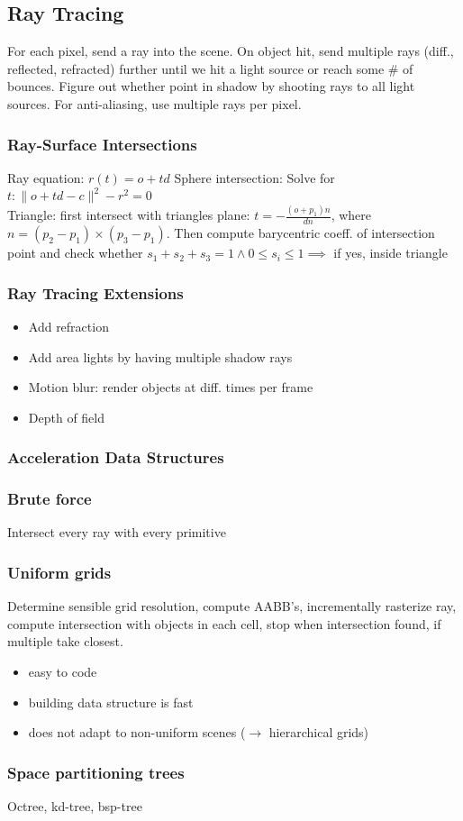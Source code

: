\documentclass[a4paper,10pt]{article}
\newcommand*\good{\item[\textcolor{goodgreen}{\(\bm{+}\)}]}
\newcommand*\bad{\item[\textcolor{badred}{\(\bm{-}\)}]}
\begin{document}
\subsection{Ray Tracing}
For each pixel, send a ray into the scene. On object hit, send multiple rays (diff., reflected, refracted) further until we hit a light source or reach some \# of bounces. Figure out whether point in shadow by shooting rays to all light sources. For anti-aliasing, use multiple rays per pixel.

\subsubsection{Ray-Surface Intersections} Ray equation: \( r(t) = o + td \)
Sphere intersection: Solve for \( t: \lVert o + td - c \rVert ^2 - r^2 = 0 \) \\
Triangle: first intersect with triangles plane: \( t = -\frac{(o+p_{1})n}{dn} \), where \( n = (p_{2}-p_{1})\times(p_{3}-p_{1}) \).
Then compute barycentric coeff. of intersection point and check whether \( s_{1}+s_{2}+s_{3} = 1 \land 0 \le s_i \le 1 \implies \) if yes, inside triangle

\subsubsection{Ray Tracing Extensions}
\begin{itemize}
    \item Add refraction
    \item Add area lights by having multiple shadow rays
    \item Motion blur: render objects at diff. times per frame
    \item Depth of field
\end{itemize}

\subsubsection{Acceleration Data Structures}
\smallskip
\subsubsection{Brute force} Intersect every ray with every primitive
\subsubsection{Uniform grids} Determine sensible grid resolution, compute AABB's, incrementally rasterize ray, compute intersection with objects in each cell, stop when intersection found, if multiple take closest.
\begin{itemize}
    \good easy to code
    \good building data structure is fast
    \bad does not adapt to non-uniform scenes (\( \to  \) hierarchical grids)
\end{itemize}
\subsubsection{Space partitioning trees} Octree, kd-tree, bsp-tree
\end{document}
